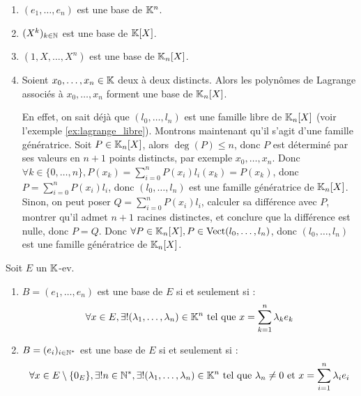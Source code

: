 \documentclass[12pt, a4paper]{report}
\begin{document}
\begin{example}
    \begin{enumerate}
        \item $(e_1,\dots,e_n)$ est une base de $\mathbb{K}^n$.
        \item $(X^k)_{k \in \mathbb{N}}$ est une base de $\mathbb{K}[X]$.
        \item $(1,X,\dots,X^n)$ est une base de $\mathbb{K}_n[X]$.
        \item Soient $x_0,\dots,x_n \in \mathbb{K}$ deux à deux distincts. Alors les polynômes de Lagrange associés à $x_0,\dots,x_n$ forment une base de $\mathbb{K}_n[X]$.
        \begin{outline}
            \1 En effet, on sait déjà que $(l_0,\dots,l_n)$ est une famille libre de $\mathbb{K}_n[X]$ (voir l'exemple \ref{ex:lagrange_libre}).
            \1 Montrons maintenant qu'il s'agit d'une famille génératrice.
                \2 Soit $P \in \mathbb{K}_n[X]$, alors $\deg(P) \le n$, donc $P$ est déterminé par ses valeurs en $n+1$ points distincts, par exemple $x_0,\dots,x_n$.
                \2 Donc $\forall k \in \{0,\dots,n\}, P(x_k) = \sum_{i=0}^n P(x_i) l_i(x_k) = P(x_k)$, donc $P = \sum_{i=0}^n P(x_i) l_i$, donc $(l_0,\dots,l_n)$ est une famille génératrice de $\mathbb{K}_n[X]$.
                \2 Sinon, on peut poser $Q = \sum_{i=0}^n P(x_i) l_i$, calculer sa différence avec $P$, montrer qu'il admet $n+1$ racines distinctes, et conclure que la différence est nulle, donc $P = Q$.
                \2 Donc $\forall P \in \mathbb{K}_n[X], P \in \mathrm{Vect}(l_0,\dots,l_n)$, donc $(l_0,\dots,l_n)$ est une famille génératrice de $\mathbb{K}_n[X]$.
        \end{outline}
    \end{enumerate}
\end{example}

\begin{property}
    Soit $E$ un $\mathbb{K}$-ev.
    \begin{enumerate}
        \item $B = (e_1,\dots,e_n)$ est une base de $E$ si et seulement si : 
        $$\forall x \in E, \exists ! (\lambda_1,\dots,\lambda_n) \in \mathbb{K}^n \text{ tel que } x = \sum_{k=1}^n \lambda_k e_k$$
        \item $B = (e_i)_{i \in \mathbb{N}^*}$ est une base de $E$ si et seulement si : 
        $$\forall x \in E \setminus \{0_E\}, \exists ! n \in \mathbb{N}^*, \exists ! (\lambda_1,\dots,\lambda_n) \in \mathbb{K}^n \text{ tel que } \lambda_n \neq 0 \text{ et } x = \sum_{i=1}^{n}\lambda_i e_i$$
    \end{enumerate}
\end{property}
\end{document}
